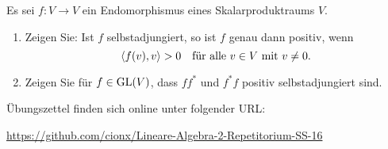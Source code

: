 \documentclass[a4paper, 10pt]{scrartcl}
\begin{document}
\begin{question}
  Es sei $f \colon V \to V$ ein Endomorphismus eines Skalarproduktraums $V$.
  \begin{enumerate}[leftmargin=*]
    \item
      Zeigen Sie: Ist $f$ selbstadjungiert, so ist $f$ genau dann positiv, wenn
      \[
        \left\langle f(v), v \right\rangle > 0
        \quad
        \text{für alle $v \in V$ mit $v \neq 0$}.
      \]
    \item
      Zeigen Sie für $f \in \mathrm{GL}(V)$, dass $f f^*$ und $f^* f$ positiv selbstadjungiert sind.
  \end{enumerate}
\end{question}




Übungszettel finden sich online unter folgender URL:\\
\centerline{\url{https://github.com/cionx/Lineare-Algebra-2-Repetitorium-SS-16}}


\newpage


\printsolutions
\end{document}
